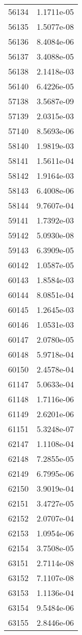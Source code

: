 \begin{table}[h!]
\begin{tabular}{|| c || c |}
56134 & 1.1711e-05 \\
56135 & 1.5077e-08 \\
56136 & 8.4084e-06 \\
56137 & 3.4088e-05 \\
56138 & 2.1418e-03 \\
56140 & 6.4226e-05 \\
57138 & 3.5687e-09 \\
57139 & 2.0315e-03 \\
57140 & 8.5693e-06 \\
58140 & 1.9819e-03 \\
58141 & 1.5611e-04 \\
58142 & 1.9164e-03 \\
58143 & 6.4008e-06 \\
58144 & 9.7607e-04 \\
59141 & 1.7392e-03 \\
59142 & 5.0930e-08 \\
59143 & 6.3909e-05 \\
60142 & 1.0587e-05 \\
60143 & 1.8584e-03 \\
60144 & 8.0851e-04 \\
60145 & 1.2645e-03 \\
60146 & 1.0531e-03 \\
60147 & 2.0780e-05 \\
60148 & 5.9718e-04 \\
60150 & 2.4578e-04 \\
61147 & 5.0633e-04 \\
61148 & 1.7116e-06 \\
61149 & 2.6201e-06 \\
61151 & 5.3248e-07 \\
62147 & 1.1108e-04 \\
62148 & 7.2855e-05 \\
62149 & 6.7995e-06 \\
62150 & 3.9019e-04 \\
62151 & 3.4727e-05 \\
62152 & 2.0707e-04 \\
62153 & 1.0954e-06 \\
62154 & 3.7508e-05 \\
63151 & 2.7114e-08 \\
63152 & 7.1107e-08 \\
63153 & 1.1136e-04 \\
63154 & 9.5484e-06 \\
63155 & 2.8446e-06 \\

\end{tabular}
\end{table}
